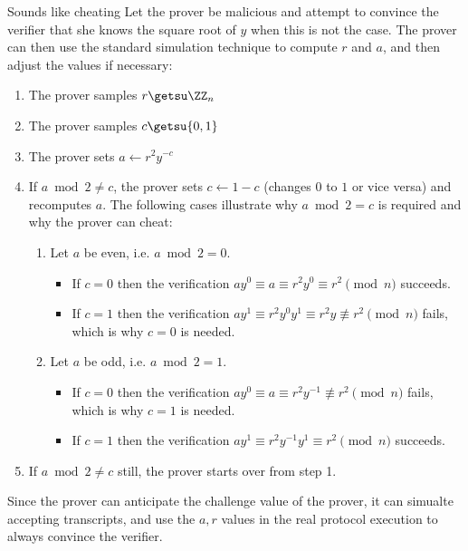 \documentclass{practice}
\begin{document}
\begin{task}{Sounds like cheating}
  Let the prover be malicious and attempt to convince the verifier that she knows the square root of $y$ when this is not the case.
  The prover can then use the standard simulation technique to compute $r$ and $a$, and then adjust the values if necessary:
  \begin{enumerate}
    \item The prover samples $r \getsu \ZZ_n$
    \item The prover samples $c \getsu \{0,1\}$
    \item The prover sets $a \gets r^2y^{-c}$
    \item If $a \bmod 2 \neq c$, the prover sets $c \gets 1 - c$ (changes $0$ to $1$ or vice versa) and recomputes $a$.
    The following cases illustrate why $a \bmod 2 = c$ is required and why the prover can cheat:
    \begin{enumerate}
      \item Let $a$ be even, i.e. $a \bmod 2 = 0$.
      \begin{itemize}
        \item If $c = 0$ then the verification $ay^0 \equiv a \equiv r^2y^{0} \equiv r^2 \pmod{n}$ succeeds.
        \item If $c = 1$ then the verification $ay^1 \equiv r^2y^{0}y^1 \equiv r^2y \not\equiv r^2 \pmod{n}$ fails, which is why $c = 0$ is needed.
      \end{itemize}
      \item Let $a$ be odd, i.e. $a \bmod 2 = 1$.
      \begin{itemize}
        \item If $c = 0$ then the verification $ay^0 \equiv a \equiv r^2y^{-1} \not\equiv r^2 \pmod{n}$ fails, which is why $c = 1$ is needed.
        \item If $c = 1$ then the verification $ay^1 \equiv r^2y^{-1}y^1 \equiv r^2 \pmod{n}$ succeeds.
      \end{itemize}
    \end{enumerate}

    \item If $a \bmod 2 \neq c$ still, the prover starts over from step 1.
  \end{enumerate}

  Since the prover can anticipate the challenge value of the prover, it can simualte accepting transcripts, and use the $a, r$ values in the real protocol execution to always convince the verifier. 
\end{task}
\end{document}

